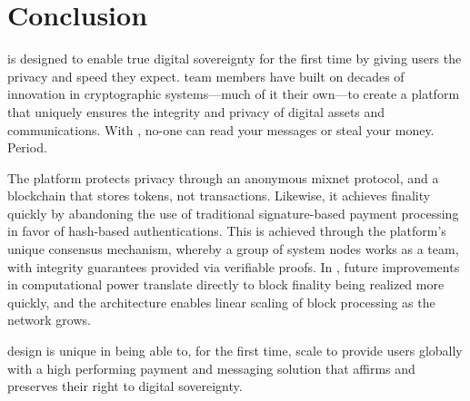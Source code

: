 \section{Conclusion}

\name is designed to enable true digital sovereignty for the first time by giving users the privacy and speed they expect. \name team members have built on decades of innovation in cryptographic systems---much of it their own---to create a platform that uniquely ensures the integrity and privacy of digital assets and communications. With \name, no-one can read your messages or steal your money. Period.

The \name platform protects privacy through an anonymous mixnet protocol, and a blockchain that stores tokens, not transactions. Likewise, it achieves finality quickly by abandoning the use of traditional signature-based payment processing in favor of hash-based authentications. This is achieved through the platform’s unique consensus mechanism, whereby a group of system nodes works as a team, with integrity guarantees provided via verifiable proofs. In \name, future improvements in computational power translate directly to block finality being realized more quickly, and the architecture enables linear scaling of block processing as the network grows.

\name design is unique in being able to, for the first time, scale to provide users globally with a high performing payment and messaging solution that affirms and preserves their right to digital sovereignty.
